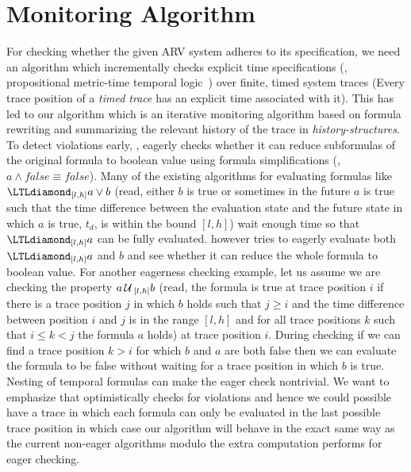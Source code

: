 
\section{Monitoring Algorithm}

For checking whether the given ARV system  adheres to its specification,
we need an algorithm which %
incrementally checks explicit time specifications (\ie, propositional metric-time temporal logic~\cite{Koymans1990})
over finite, timed system traces (Every trace position of a \emph{timed trace} has an explicit time associated with it).
This has led to our algorithm \monitor which is an iterative monitoring algorithm based on formula rewriting and summarizing the relevant history of the trace
in \emph{history-structures}. To detect violations early, \monitor, eagerly checks whether it can reduce subformulas of the original formula to boolean value
using formula simplifications (\eg, $a\wedge \mathit{false} \equiv \mathit{false}$).
Many of the existing algorithms for evaluating formulas like $\eventually_{[l,h]} a \vee b$
(read, either $b$ is true or sometimes in the future $a$ is true such that the time difference
between the evaluation state and the future state in which $a$ is true, $t_d$, is within the
bound $[l,h]$) wait enough time so that $\eventually_{[l,h]} a$ can be fully evaluated.
\monitor however tries to eagerly evaluate both $\eventually_{[l,h]} a$ and $b$ and see
whether it can reduce the whole formula to boolean value.
For another eagerness checking example,
let us assume we are checking the property $a\,\mathrm{\cal U}\,_{[l, h]}b$ (read, the formula is true at trace position $i$ if there is a trace position
$j$ in which $b$ holds such that $j\geq i$ and the time difference between position $i$ and $j$ is in the range $[l,h]$
and for all trace positions $k$ such that $i\leq k < j$ the formula $a$ holds) at trace position $i$.
During checking if we can find a trace position $k > i$ for which $b$ and $a$ are both false then we can evaluate the formula to be
false without waiting for a trace position in which $b$ is true. Nesting of  temporal formulas can make the eager check nontrivial.
We want to emphasize that \monitor optimistically
checks for violations and hence we could possible have a trace in which each formula can only be evaluated in
the last possible trace position in which case our algorithm will behave in the exact same way as the current non-eager
algorithms modulo the extra computation \monitor performs for eager checking.
%

